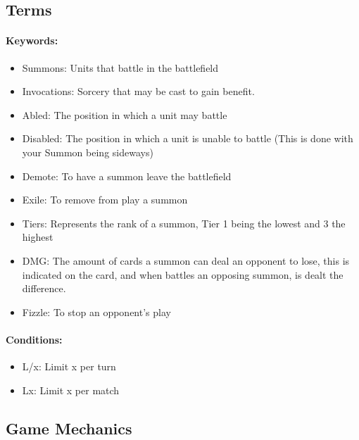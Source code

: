 \documentclass[12pt, letterpaper]{article}
\begin{document}
\newpage
\subsection{Terms}
\paragraph{Keywords: }
\begin{itemize}
    \item Summons: Units that battle in the battlefield
    \item Invocations: Sorcery that may be cast to gain benefit. 
    \item Abled: The position in which a unit may battle 
    \item Disabled: The position in which a unit is unable to battle (This is done with your Summon being sideways)
    \item Demote: To have a summon leave the battlefield
    \item Exile: To remove from play a summon
    \item Tiers: Represents the rank of a summon, Tier 1 being the lowest and 3 the highest
    \item DMG: The amount of cards a summon can deal an opponent to lose, this is indicated on the card, and when battles an opposing summon, is dealt the difference.
    \item Fizzle: To stop an opponent's play 
\end{itemize}
\paragraph{Conditions:}
\begin{itemize}
    \item L/x: Limit x per turn
    \item Lx: Limit x per match
\end{itemize}
\newpage
\subsection{Game Mechanics}
\end{document}
